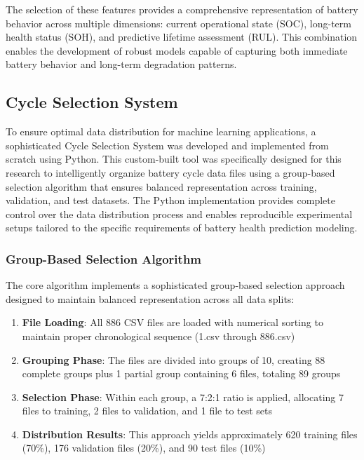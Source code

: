 The selection of these features provides a comprehensive representation of battery behavior across multiple dimensions: current operational state (SOC), long-term health status (SOH), and predictive lifetime assessment (RUL). This combination enables the development of robust models capable of capturing both immediate battery behavior and long-term degradation patterns.

\subsection{Cycle Selection System}
\label{subsec:cycle_selection_system}

To ensure optimal data distribution for machine learning applications, a sophisticated Cycle Selection System was developed and implemented from scratch using Python. This custom-built tool was specifically designed for this research to intelligently organize battery cycle data files using a group-based selection algorithm that ensures balanced representation across training, validation, and test datasets. The Python implementation provides complete control over the data distribution process and enables reproducible experimental setups tailored to the specific requirements of battery health prediction modeling.

\subsubsection{Group-Based Selection Algorithm}

The core algorithm implements a sophisticated group-based selection approach designed to maintain balanced representation across all data splits:

\begin{enumerate}
    \item \textbf{File Loading}: All 886 CSV files are loaded with numerical sorting to maintain proper chronological sequence (1.csv through 886.csv)
    \item \textbf{Grouping Phase}: The files are divided into groups of 10, creating 88 complete groups plus 1 partial group containing 6 files, totaling 89 groups
    \item \textbf{Selection Phase}: Within each group, a 7:2:1 ratio is applied, allocating 7 files to training, 2 files to validation, and 1 file to test sets
    \item \textbf{Distribution Results}: This approach yields approximately 620 training files (70\%), 176 validation files (20\%), and 90 test files (10\%)
\end{enumerate}

